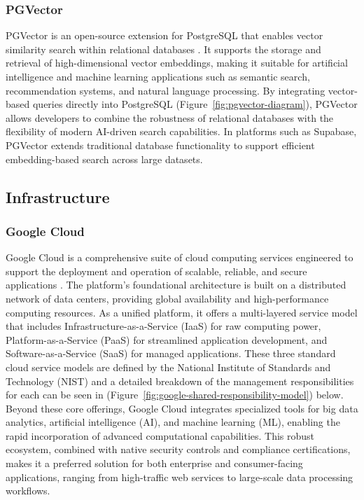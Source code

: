 \subsubsection{PGVector}
PGVector is an open-source extension for PostgreSQL that enables vector similarity search within relational databases \cite{supabase2025pgvector}. It supports the storage and retrieval of high-dimensional vector embeddings, making it suitable for artificial intelligence and machine learning applications such as semantic search, recommendation systems, and natural language processing. By integrating vector-based queries directly into PostgreSQL (Figure~\ref{fig:pgvector-diagram}), PGVector allows developers to combine the robustness of relational databases with the flexibility of modern AI-driven search capabilities. In platforms such as Supabase, PGVector extends traditional database functionality to support efficient embedding-based search across large datasets.
 
\subsection{Infrastructure}
\subsubsection{Google Cloud}
Google Cloud is a comprehensive suite of cloud computing services engineered to support the deployment and operation of scalable, reliable, and secure applications \cite{googlecloud2025docs}. The platform's foundational architecture is built on a distributed network of data centers, providing global availability and high-performance computing resources. As a unified platform, it offers a multi-layered service model that includes Infrastructure-as-a-Service (IaaS) for raw computing power, Platform-as-a-Service (PaaS) for streamlined application development, and Software-as-a-Service (SaaS) for managed applications. These three standard cloud service models are defined by the National Institute of Standards and Technology (NIST) and a detailed breakdown of the management responsibilities for each can be seen in (Figure~\ref{fig:google-shared-responsibility-model}) below.
Beyond these core offerings, Google Cloud integrates specialized tools for big data analytics, artificial intelligence (AI), and machine learning (ML), enabling the rapid incorporation of advanced computational capabilities. This robust ecosystem, combined with native security controls and compliance certifications, makes it a preferred solution for both enterprise and consumer-facing applications, ranging from high-traffic web services to large-scale data processing workflows.

